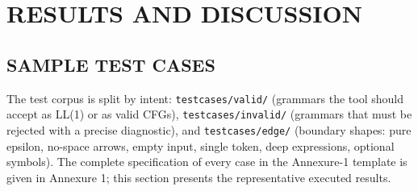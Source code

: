 \documentclass[12pt,a4paper,oneside,openany]{report}
\newcommand{\code}[1]{\texttt{#1}}
\begin{document}


\chapter{RESULTS AND DISCUSSION}

\section{SAMPLE TEST CASES}
The test corpus is split by intent: \code{testcases/valid/} (grammars the
tool should accept as LL(1) or as valid CFGs), \code{testcases/invalid/}
(grammars that must be rejected with a precise diagnostic), and
\code{testcases/edge/} (boundary shapes: pure epsilon, no-space arrows,
empty input, single token, deep expressions, optional symbols). The
complete specification of every case in the Annexure-1 template is given
in Annexure 1; this section presents the representative executed results.
\end{document}
